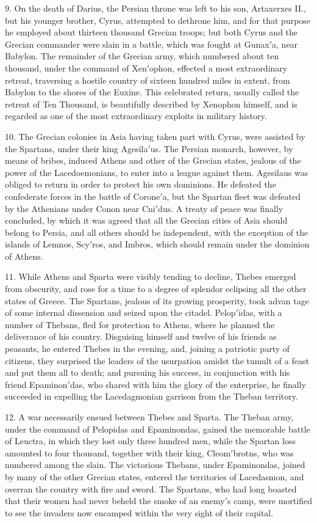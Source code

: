 \documentclass[openany,a4paper]{memoir}
\begin{document}
9. On the death of Darius, the Persian throne was left to 
his son, Artaxerxes II., but his younger brother, Cyrus, attempted to dethrone him, and for that purpose he employed 
about thirteen thousand Grecian troops; but both Cyrus and 
the Grecian commander were slain in a battle, which was 
fought at Gunax$'$a, near Babylon. The remainder of the 
Grecian army, which numbered about ten thousand, under 
the command of Xen$'$ophon, effected a most extraordinary 
retreat, traversing a hostile country of sixteen hundred miles 
in extent, from Babylon to the shores of the Euxine. This 
celebrated return, usually called the retreat of Ten Thousand, 
is beautifully described by Xenophon himself, and is regarded 
as one of the most extraordinary exploits in military history. 

10. The Grecian colonies in Asia having taken part with 
Cyrus, were assisted by the Spartans, under their king 
Agesila$'$us. The Persian monarch, however, by means of 
bribes, induced Athens and other of the Grecian states, jealous of the power of the Lacedoemonians, to enter into a 
league against them. Agesilaus was obliged to return in 
order to protect his own dominions. He defeated the confederate forces in the battle of Corone$'$a, but the Spartan 
fleet was defeated by the Athenians under Conon near 
Cni$'$dus. A treaty of peace was finally concluded, by which 
it was agreed that all the Grecian cities of Asia should belong to Persia, and all others should be independent, with 
the exception of the islands of Lemnos, Scy$'$ros, and Imbros, 
which should remain under the dominion of Athens. 

11. While Athens and Sparta were visibly tending to decline, Thebes emerged from obscurity, and rose for a time to 
a degree of splendor eclipsing all the other states of Greece. 
The Spartans, jealous of its growing prosperity, took advan
tage of some internal dissension and seized upon the citadel. 
Pelop$'$idas, with a number of Thebans, fled for protection to 
Athens, where he planned the deliverance of his country. 
Disguising himself and twelve of his friends as peasants, he 
entered Thebes in the evening, and, joining a patriotic party 
of citizens, they surprised the leaders of the usurpation 
amidst the tumult of a feast and put them all to death; and 
pursuing his success, in conjunction with his friend Epaminon$'$das, who shared with him the glory of the enterprise, 
he finally succeeded in expelling the Lacedagmonian garrison 
from the Theban territory. 

12. A war necessarily ensued between Thebes and Sparta. 
The Theban army, under the command of Pelopidas and 
Epaminondas, gained the memorable battle of Leuctra, in 
which they lost only three hundred men, while the Spartan 
loss amounted to four thousand, together with their king, 
Cleom$'$brotns, who was numbered among the slain. The victorious Thebans, under Epaminondas, joined by many of the 
other Grecian states, entered the territories of Lacedasmon, 
and overran the country with fire and sword. The Spartans, 
who had long boasted that their women had never beheld 
the smoke of an enemy$'$s camp, were mortified to see the 
invaders now encamped within the very sight of their capital. 
\end{document}
